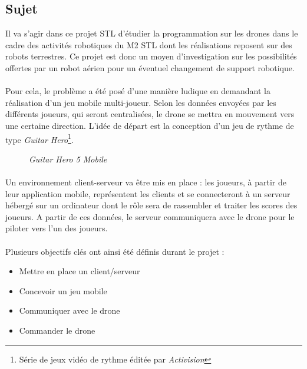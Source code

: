 \subsection{Sujet}

Il va s'agir dans ce projet STL d'étudier la programmation sur les drones dans le cadre des activités robotiques du M2 STL dont les réalisations reposent sur des robots terrestres. Ce projet est donc un moyen d'investigation sur les possibilités offertes par un robot aérien pour un éventuel changement de support robotique.

\paragraph{}
Pour cela, le problème a été posé d'une manière ludique en demandant la réalisation d'un jeu mobile multi-joueur. Selon les données envoyées par les différents joueurs, qui seront centralisées, le drone se mettra en mouvement vers une certaine direction. L'idée de départ est la conception d'un jeu de rythme de type \textit{Guitar Hero}\footnote{Série de jeux vidéo de rythme éditée par \textit{Activision}}.

\begin{figure}[h]
\begin{center}
\end{center}
\caption{\textit{Guitar Hero 5 Mobile}}
\end{figure}

\paragraph{}
Un environnement client-serveur va être mis en place : les joueurs, à partir de leur application mobile, représentent les clients et se connecteront à un serveur hébergé sur un ordinateur dont le rôle sera de rassembler et traiter les scores des joueurs. A partir de ces données, le serveur communiquera avec le drone pour le piloter vers l'un des joueurs. 

\paragraph{}
Plusieurs objectifs clés ont ainsi été définis durant le projet :
\begin{itemize}
\item Mettre en place un client/serveur
\item Concevoir un jeu mobile
\item Communiquer avec le drone
\item Commander le drone
\end{itemize}